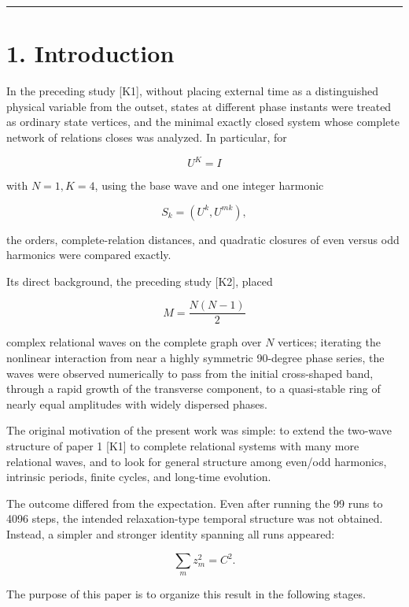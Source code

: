 \documentclass[
  a4paper,
]{article}
\begin{document}
\begin{center}\rule{0.5\linewidth}{0.5pt}\end{center}

\section{1. Introduction}\label{introduction}

In the preceding study {[}K1{]}, without placing external time as a
distinguished physical variable from the outset, states at different
phase instants were treated as ordinary state vertices, and the minimal
exactly closed system whose complete network of relations closes was
analyzed. In particular, for

\[
U^K=I
\]

with \(N=1,K=4\), using the base wave and one integer harmonic

\[
S_k=(U^k,U^{mk}),
\]

the orders, complete-relation distances, and quadratic closures of even
versus odd harmonics were compared exactly.

Its direct background, the preceding study {[}K2{]}, placed

\[
M=\frac{N(N-1)}{2}
\]

complex relational waves on the complete graph over \(N\) vertices;
iterating the nonlinear interaction from near a highly symmetric
90-degree phase series, the waves were observed numerically to pass from
the initial cross-shaped band, through a rapid growth of the transverse
component, to a quasi-stable ring of nearly equal amplitudes with widely
dispersed phases.

The original motivation of the present work was simple: to extend the
two-wave structure of paper 1 {[}K1{]} to complete relational systems
with many more relational waves, and to look for general structure among
even/odd harmonics, intrinsic periods, finite cycles, and long-time
evolution.

The outcome differed from the expectation. Even after running the 99
runs to 4096 steps, the intended relaxation-type temporal structure was
not obtained. Instead, a simpler and stronger identity spanning all runs
appeared:

\[
\boxed{\sum_m z_m^2=C^2}.
\]

The purpose of this paper is to organize this result in the following
stages.
\end{document}
